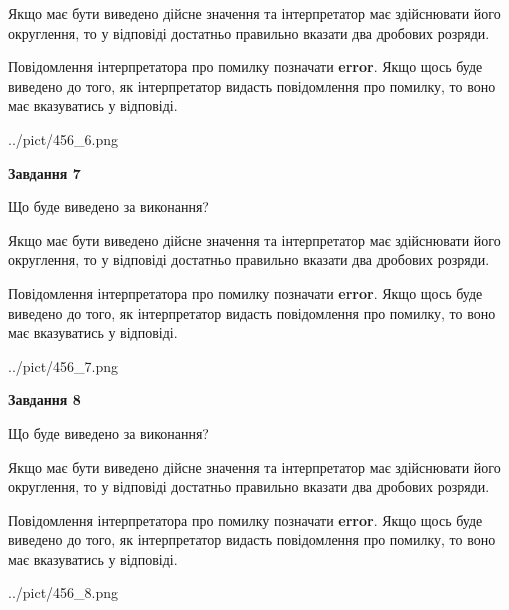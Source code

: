 \documentclass[12pt, ukrainian]{article}
\begin{document}
{\begin {Large}
Якщо має бути виведено дійсне значення та інтерпретатор має здійснювати його округлення, 
то у відповіді достатньо правильно вказати два дробових розряди.

Повідомлення інтерпретатора про помилку позначати \textbf{error}.
Якщо щось буде виведено до того, як інтерпретатор видасть повідомлення про помилку, 
то воно має вказуватись у відповіді. \par

\begin{center}
	{../pict/456_6.png}
\end{center}
\newpage

{\begin {center}\textbf{Завдання 7}\end {center}}\par
Що буде виведено за виконання? \par

Якщо має бути виведено дійсне значення та інтерпретатор має здійснювати його округлення, 
то у відповіді достатньо правильно вказати два дробових розряди.

Повідомлення інтерпретатора про помилку позначати \textbf{error}.
Якщо щось буде виведено до того, як інтерпретатор видасть повідомлення про помилку, 
то воно має вказуватись у відповіді. \par

\begin{center}
	{../pict/456_7.png}
\end{center}
\newpage

{\begin {center}\textbf{Завдання 8}\end {center}}\par
Що буде виведено за виконання? \par

Якщо має бути виведено дійсне значення та інтерпретатор має здійснювати його округлення, 
то у відповіді достатньо правильно вказати два дробових розряди.

Повідомлення інтерпретатора про помилку позначати \textbf{error}.
Якщо щось буде виведено до того, як інтерпретатор видасть повідомлення про помилку, 
то воно має вказуватись у відповіді. \par

\begin{center}
	{../pict/456_8.png}
\end{center}
\newpage


\end{Large}}
\end{document}

